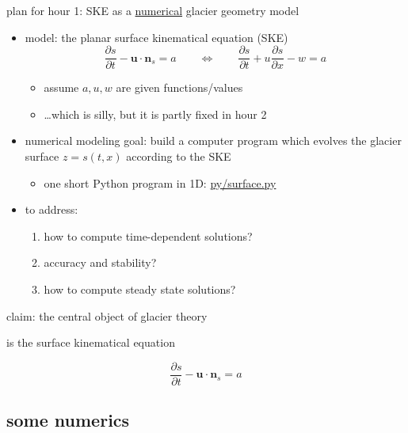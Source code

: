 \documentclass[10pt,dvipsnames]{beamer}
\newcommand{\bn}{\mathbf{n}}
\newcommand{\bu}{\mathbf{u}}
\begin{document}
\begin{frame}{plan for hour 1: SKE as a \underline{numerical} glacier geometry model}

\begin{itemize}
\item \alert{model:} the planar surface kinematical equation (SKE)
\begin{equation*}
\frac{\partial s}{\partial t} - \bu \cdot \bn_s = a \qquad \iff \qquad \frac{\partial s}{\partial t} + u \frac{\partial s}{\partial x} - w = a
\end{equation*}

    \begin{itemize}
    \item[$\circ$] assume $a,u,w$ are \alert{given} functions/values
    \item[$\circ$] \dots which is silly, but it is partly fixed in hour 2
    \end{itemize}
\item \alert{numerical modeling goal:} build a computer program which evolves the glacier surface $z=s(t,x)$ according to the SKE
    \begin{itemize}
    \item[$\circ$] one short Python program in 1D: \quad \href{https://github.com/bueler/mccarthy/blob/master/py/surface.py}{py/surface.py}
    \end{itemize}
\item \alert{to address:}
     \begin{enumerate}
     \item how to compute time-dependent solutions?
     \item accuracy and stability?
     \item how to compute steady state solutions?
     \end{enumerate}
\end{itemize}
\end{frame}


\begin{frame}[standout]
claim: the central object of glacier theory

is the surface kinematical equation

\begin{equation*}
\frac{\partial s}{\partial t} - \bu \cdot \bn_s = a
\end{equation*}
\end{frame}


\subsection{some numerics}
\end{document}
